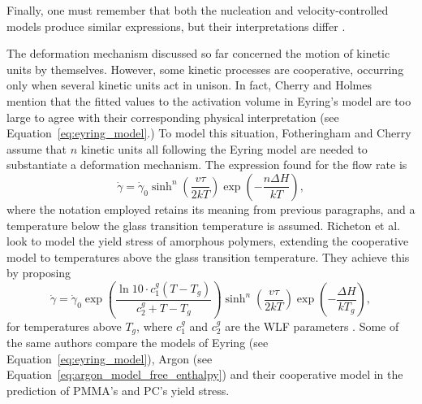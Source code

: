 Finally, one must remember that both the nucleation and velocity-controlled models produce similar expressions, but their interpretations differ \citep{fotheringhamRoleRecoveryForces1978}.

The deformation mechanism discussed so far concerned the motion of kinetic units by themselves.
However, some kinetic processes are cooperative, occurring only when several kinetic units act in unison.
In fact, Cherry and Holmes \citep{cherryYieldAdhesiveJoints1969} mention that the fitted values to the activation volume in Eyring's model are too large to agree with their corresponding physical interpretation (see Equation~\eqref{eq:eyring_model}.)
To model this situation, Fotheringham and Cherry \citep{fotheringhamCommentCompressionYield1976, fotheringhamRoleRecoveryForces1978} assume that $n$ kinetic units all following the Eyring model are needed to substantiate a deformation mechanism.
The expression found for the flow rate is
\begin{equation}
  \label{eq:cooperative_flow_rule}
	\dot{\gamma}=\dot \gamma_0 \sinh ^n\left(\frac{v \tau}{2 k T}\right) \exp \left(-\frac{n \Delta H}{k T}\right),
\end{equation}
where the notation employed retains its meaning from previous paragraphs, and a temperature below the glass transition temperature is assumed.
Richeton et al. \citep{richetonFormulationCooperativeModel2005} look to model the yield stress of amorphous polymers, extending the cooperative model to temperatures above the glass transition temperature.
They achieve this by proposing
\begin{equation}
		\dot{\gamma}=\dot \gamma_0 \exp\left(\frac{\ln 10\cdot c_1^g(T - T_g)}{c_2^g + T - T_g}\right) \sinh ^n\left(\frac{v \tau}{2 k T}\right) \exp \left(-\frac{\Delta H}{k T_g}\right),
\end{equation}
for temperatures above $T_g$, where $c_1^g$ and $c_2^g$ are the WLF parameters \citep{wardIntroductionMechanicalProperties2004}.
Some of the same authors \citep{richetonThermodynamicInvestigationYieldstress2007} compare the models of Eyring (see Equation~\eqref{eq:eyring_model}), Argon (see Equation~\eqref{eq:argon_model_free_enthalpy}) and their cooperative model in the prediction of PMMA's and PC's yield stress.

